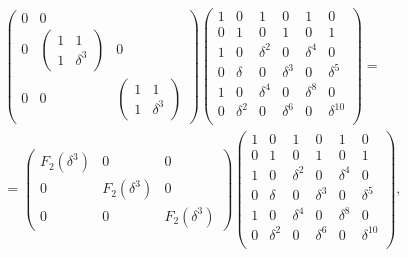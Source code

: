 \begin{multline*}
\begin{pmatrix}
        0
        &
        0
        \\
        0
        &
        \begin{pmatrix}
            1 & 1        \\
            1 & \delta^3
        \end{pmatrix}
        &
        0
        \\
        0
        &
        0
        &
        \begin{pmatrix}
            1 & 1        \\
            1 & \delta^3
        \end{pmatrix}
    \end{pmatrix}
    \begin{pmatrix}
        1 & 0        & 1        & 0        & 1        & 0           \\
        0 & 1        & 0        & 1        & 0        & 1           \\
        1 & 0        & \delta^2 & 0        & \delta^4 & 0           \\
        0 & \delta   & 0        & \delta^3 & 0        & \delta^5    \\
        1 & 0        & \delta^4 & 0        & \delta^8 & 0           \\
        0 & \delta^2 & 0        & \delta^6 & 0        & \delta^{10} \\
    \end{pmatrix} = \\
    =
    \begin{pmatrix}
        F_2(\delta^3) & 0             & 0             \\
        0             & F_2(\delta^3) & 0             \\
        0             & 0             & F_2(\delta^3)
    \end{pmatrix}
    \begin{pmatrix}
        1 & 0        & 1        & 0        & 1        & 0           \\
        0 & 1        & 0        & 1        & 0        & 1           \\
        1 & 0        & \delta^2 & 0        & \delta^4 & 0           \\
        0 & \delta   & 0        & \delta^3 & 0        & \delta^5    \\
        1 & 0        & \delta^4 & 0        & \delta^8 & 0           \\
        0 & \delta^2 & 0        & \delta^6 & 0        & \delta^{10} \\
    \end{pmatrix} ,
\end{multline*}
